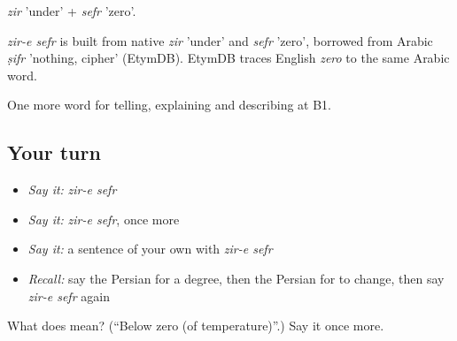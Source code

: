 \emph{zir} 'under' + \emph{sefr} 'zero'.

\begin{cousinweb}
\emph{zir-e sefr} is built from native \emph{zir} 'under' and \emph{sefr} 'zero', borrowed from Arabic \emph{ṣifr} 'nothing, cipher' (EtymDB). EtymDB traces English \emph{zero} to the same Arabic word.
\end{cousinweb}

\begin{grammarlens}[title={What you've built}]
One more word for telling, explaining and describing at B1.
\end{grammarlens}

\subsection*{Your turn}
\begin{itemize}
\raggedright
  \item \emph{Say it:} \emph{zir-e sefr}
  \item \emph{Say it:} \emph{zir-e sefr}, once more
  \item \emph{Say it:} a sentence of your own with \emph{zir-e sefr}
  \item \emph{Recall:} say the Persian for a degree, then the Persian for to change, then say \emph{zir-e sefr} again
\end{itemize}

\begin{tcolorbox}[breakable,colback=teal!4,colframe=teal!35!black,title={Before you move on}]
What does   mean? (\textquotedblleft{}Below zero (of temperature)\textquotedblright{}.) Say it once more.
\end{tcolorbox}

